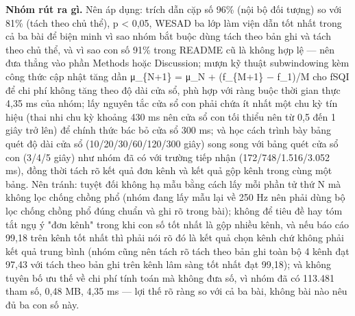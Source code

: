 \documentclass[12pt,a4paper]{article}
\begin{document}
\noindent \textbf{\color{tdtblue}Nhóm rút ra gì.} Nên áp dụng: trích dẫn cặp số 96\% (nội bộ đối tượng) so với 81\% (tách theo chủ thể), p < 0,05, WESAD ba lớp làm viện dẫn tốt nhất trong cả ba bài để biện minh vì sao nhóm bắt buộc dùng tách theo bản ghi và tách theo chủ thể, và vì sao con số 91\% trong README cũ là không hợp lệ — nên đưa thẳng vào phần Methods hoặc Discussion; mượn kỹ thuật subwindowing kèm công thức cập nhật tăng dần μ\_\{N+1\} = μ\_N + (f\_\{M+1\} − f\_1)/M cho fSQI để chi phí không tăng theo độ dài cửa sổ, phù hợp với ràng buộc thời gian thực 4,35 ms của nhóm; lấy nguyên tắc cửa sổ con phải chứa ít nhất một chu kỳ tín hiệu (thai nhi chu kỳ khoảng 430 ms nên cửa sổ con tối thiểu nên từ 0,5 đến 1 giây trở lên) để chính thức bác bỏ cửa sổ 300 ms; và học cách trình bày bảng quét độ dài cửa sổ (10/20/30/60/120/300 giây) song song với bảng quét cửa sổ con (3/4/5 giây) như nhóm đã có với trường tiếp nhận (172/748/1.516/3.052 ms), đồng thời tách rõ kết quả đơn kênh và kết quả gộp kênh trong cùng một bảng. Nên tránh: tuyệt đối không hạ mẫu bằng cách lấy mỗi phần tử thứ N mà không lọc chống chồng phổ (nhóm đang lấy mẫu lại về 250 Hz nên phải dùng bộ lọc chống chồng phổ đúng chuẩn và ghi rõ trong bài); không để tiêu đề hay tóm tắt ngụ ý "đơn kênh" trong khi con số tốt nhất là gộp nhiều kênh, và nếu báo cáo 99,18 trên kênh tốt nhất thì phải nói rõ đó là kết quả chọn kênh chứ không phải kết quả trung bình (nhóm cũng nên tách rõ tách theo bản ghi toàn bộ 4 kênh đạt 97,43 với tách theo bản ghi trên kênh lâm sàng tốt nhất đạt 99,18); và không tuyên bố ưu thế về chi phí tính toán mà không đưa số, vì nhóm đã có 113.481 tham số, 0,48 MB, 4,35 ms — lợi thế rõ ràng so với cả ba bài, không bài nào nêu đủ ba con số này.\par\vspace{3pt}
\vspace{6pt}
\clearpage
\end{document}
